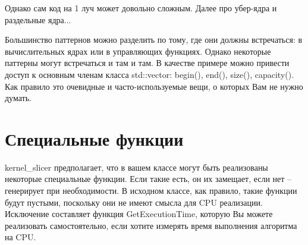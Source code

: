 \documentclass[11pt,fleqn,english,russian]{report} %
\begin{document}
Однако сам код на 1 луч может довольно сложным. Далее про убер-ядра и раздельные ядра... 

\begin{remark}
Большинство паттернов можно разделить по тому, где они должны встречаться: в вычислительных ядрах или в управляющих функциях. Однако некоторые паттерны могут встречаться и там и там. В качестве примере можно привести доступ к основным членам класса std::vector: begin(), end(), size(), capacity(). Как правило это очевидные и часто-используемые вещи, о которых Вам не нужно думать.
\end{remark}

\chapter{Специальные функции}\label{spec_functions}

kernel\_slicer предполагает, что в вашем классе могут быть реализованы некоторые специальные функции. Если такие есть, он их замещает, если нет -- генерирует при необходимости. В исходном классе, как правило, такие функции будут пустыми, поскольку они не имеют смысла для CPU реализации. Исключение составляет функция GetExecutionTime, которую Вы можете реализовать самостоятельно, если хотите измерять время выполнения алгоритма на CPU.
\end{document}
